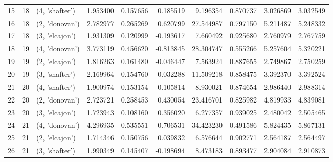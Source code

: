 \begin{tabular}{lrlrrrrrrr}
15 &     18 &  (4, 'shafter') &  1.953400 &   0.157656 &  0.185519 &    9.196354 &  0.870737 &   3.026869 &   3.032549 \\
16 &     18 &  (2, 'donovan') &  2.782977 &   0.265269 &  0.620799 &   27.544987 &  0.797150 &   5.211487 &   5.248332 \\
17 &     18 &  (3, 'elcajon') &  1.931309 &   0.120999 & -0.193617 &    7.660492 &  0.925680 &   2.760979 &   2.767759 \\
18 &     19 &  (4, 'donovan') &  3.773119 &   0.456620 & -0.813845 &   28.304747 &  0.555266 &   5.257604 &   5.320221 \\
19 &     19 &  (2, 'elcajon') &  1.816263 &   0.161480 & -0.046447 &    7.563924 &  0.887655 &   2.749867 &   2.750259 \\
20 &     19 &  (3, 'shafter') &  2.169964 &   0.154760 & -0.032288 &   11.509218 &  0.858475 &   3.392370 &   3.392524 \\
21 &     20 &  (4, 'shafter') &  1.900974 &   0.153154 &  0.105814 &    8.930021 &  0.874654 &   2.986440 &   2.988314 \\
22 &     20 &  (2, 'donovan') &  2.723721 &   0.258453 &  0.430054 &   23.416701 &  0.825982 &   4.819933 &   4.839081 \\
23 &     20 &  (3, 'elcajon') &  1.723943 &   0.108160 &  0.356020 &    6.277357 &  0.939025 &   2.480042 &   2.505465 \\
24 &     21 &  (4, 'donovan') &  4.296935 &   0.535551 & -0.706531 &   34.423230 &  0.491586 &   5.824435 &   5.867131 \\
25 &     21 &  (2, 'elcajon') &  1.714346 &   0.150756 &  0.039832 &    6.576644 &  0.902771 &   2.564187 &   2.564497 \\
26 &     21 &  (3, 'shafter') &  1.990349 &   0.145407 & -0.198694 &    8.473183 &  0.893477 &   2.904084 &   2.910873 \\
\bottomrule
\end{tabular}
